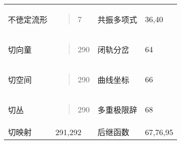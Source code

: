\documentclass{article}
\begin{document}
\begin{longtable}[]{@{}llll@{}}
\begin{minipage}[t]{0.22\columnwidth}\raggedright
不徳定流形\strut
\end{minipage} & \begin{minipage}[t]{0.22\columnwidth}\raggedright
\begin{quote}
7
\end{quote}\strut
\end{minipage} & \begin{minipage}[t]{0.22\columnwidth}\raggedright
共振多项式\strut
\end{minipage} & \begin{minipage}[t]{0.22\columnwidth}\raggedright
36,40\strut
\end{minipage}\tabularnewline
\begin{minipage}[t]{0.22\columnwidth}\raggedright
切向童\strut
\end{minipage} & \begin{minipage}[t]{0.22\columnwidth}\raggedright
\begin{quote}
290
\end{quote}\strut
\end{minipage} & \begin{minipage}[t]{0.22\columnwidth}\raggedright
闭轨分岔\strut
\end{minipage} & \begin{minipage}[t]{0.22\columnwidth}\raggedright
64\strut
\end{minipage}\tabularnewline
\begin{minipage}[t]{0.22\columnwidth}\raggedright
切空间\strut
\end{minipage} & \begin{minipage}[t]{0.22\columnwidth}\raggedright
\begin{quote}
290
\end{quote}\strut
\end{minipage} & \begin{minipage}[t]{0.22\columnwidth}\raggedright
曲线坐标\strut
\end{minipage} & \begin{minipage}[t]{0.22\columnwidth}\raggedright
66\strut
\end{minipage}\tabularnewline
\begin{minipage}[t]{0.22\columnwidth}\raggedright
切丛\strut
\end{minipage} & \begin{minipage}[t]{0.22\columnwidth}\raggedright
\begin{quote}
290
\end{quote}\strut
\end{minipage} & \begin{minipage}[t]{0.22\columnwidth}\raggedright
多重极限辞\strut
\end{minipage} & \begin{minipage}[t]{0.22\columnwidth}\raggedright
68\strut
\end{minipage}\tabularnewline
切映射 & 291,292 & 后继函数 & 67,76,95\tabularnewline
\bottomrule
\end{longtable}
\end{document}
